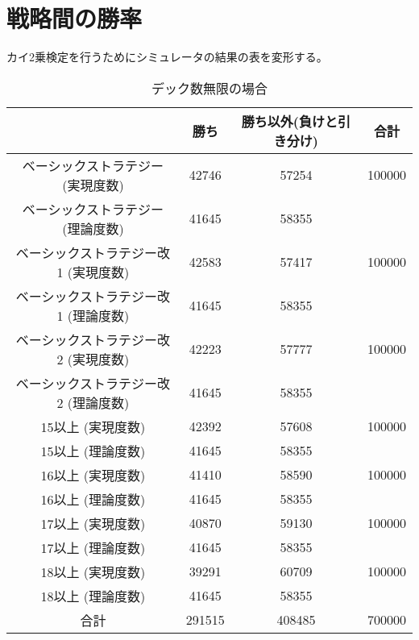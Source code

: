\section{戦略間の勝率}
カイ2乗検定を行うためにシミュレータの結果の表を変形する。
\begin{table}[H]
 \begin{center}
  \begin{tabular}{|c|c|c|c|}
    \hline
      & 勝ち & 勝ち以外(負けと引き分け) & 合計 \\
    \hline ベーシックストラテジー (実現度数)& 42746 & 57254 & 100000 \\
             ベーシックストラテジー (理論度数)& 41645 & 58355 &  \\
    \hline ベーシックストラテジー改1 (実現度数)& 42583 & 57417 & 100000 \\
             ベーシックストラテジー改1 (理論度数)& 41645 & 58355 &  \\
    \hline ベーシックストラテジー改2 (実現度数)& 42223 & 57777 & 100000 \\
              ベーシックストラテジー改2 (理論度数)& 41645 & 58355 &  \\
    \hline 15以上 (実現度数)& 42392 & 57608 & 100000 \\
             15以上 (理論度数)& 41645 & 58355 & 　\\
    \hline 16以上 (実現度数)& 41410 & 58590 & 100000 \\
             16以上 (理論度数)& 41645 & 58355 & 　\\
    \hline 17以上 (実現度数)& 40870 & 59130 & 100000 \\
             17以上 (理論度数)& 41645 & 58355 & 　\\
    \hline 18以上 (実現度数)& 39291 & 60709 & 100000 \\
             18以上 (理論度数)& 41645 & 58355 & 　\\
    \hline  合計 & 291515 & 408485 & 700000 \\
    \hline
  \end{tabular}
 \end{center}
 \caption{デック数無限の場合}
\end{table}
